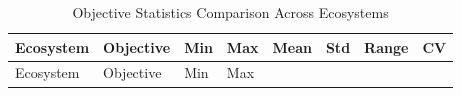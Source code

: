 \documentclass[
  letterpaper,
  DIV=11,
  numbers=noendperiod]{scrartcl}
\begin{document}
\begin{longtable}[]{@{}
  >{\raggedright\arraybackslash}p{}
  >{\raggedright\arraybackslash}p{}
  >{\raggedleft\arraybackslash}p{}
  >{\raggedleft\arraybackslash}p{}
  >{\raggedleft\arraybackslash}p{}
  >{\raggedleft\arraybackslash}p{}
  >{\raggedleft\arraybackslash}p{}
  >{\raggedleft\arraybackslash}p{}@{}}
\caption{Objective Statistics Comparison Across
Ecosystems}\tabularnewline
\toprule\noalign{}
\begin{minipage}[b]{\linewidth}\raggedright
Ecosystem
\end{minipage} & \begin{minipage}[b]{\linewidth}\raggedright
Objective
\end{minipage} & \begin{minipage}[b]{\linewidth}\raggedleft
Min
\end{minipage} & \begin{minipage}[b]{\linewidth}\raggedleft
Max
\end{minipage} & \begin{minipage}[b]{\linewidth}\raggedleft
Mean
\end{minipage} & \begin{minipage}[b]{\linewidth}\raggedleft
Std
\end{minipage} & \begin{minipage}[b]{\linewidth}\raggedleft
Range
\end{minipage} & \begin{minipage}[b]{\linewidth}\raggedleft
CV
\end{minipage} \\
\midrule\noalign{}
\endfirsthead
\toprule\noalign{}
\begin{minipage}[b]{\linewidth}\raggedright
Ecosystem
\end{minipage} & \begin{minipage}[b]{\linewidth}\raggedright
Objective
\end{minipage} & \begin{minipage}[b]{\linewidth}\raggedleft
Min
\end{minipage} & \begin{minipage}[b]{\linewidth}\raggedleft
Max
\end{minipage} & \begin{minipage}[b]{\linewidth}\raggedleft

\end{minipage}
\end{longtable}
\end{document}
